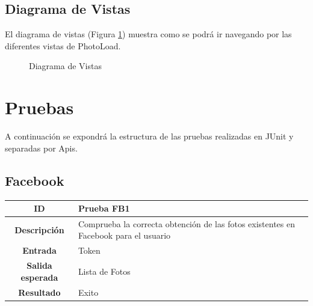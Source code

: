 \documentclass{scrartcl}
\begin{document}
\subsection{Diagrama de Vistas}\label{cap:DiagramaVistas}
El diagrama de vistas (Figura \ref{fig:DiagramaVistas}) muestra como se podrá ir navegando por las diferentes vistas de PhotoLoad.
\begin{figure}[H]
	
	\centering
	\caption{Diagrama de Vistas}
	\label{fig:DiagramaVistas}
	
\end{figure}
\section{Pruebas}\label{cap:pruebas}
A continuación se expondrá la estructura de las pruebas realizadas en JUnit y separadas por Apis.
\subsection{Facebook}

\begin{tabularx}{14cm}{|c|X|}
	\hline \textbf{ID} & Prueba FB1\\ 
	\hline \textbf{Descripción} & Comprueba la correcta obtención de las fotos existentes en Facebook para el usuario \\	 
	\hline  \textbf{Entrada}		& Token \\ 
	\hline  \textbf{Salida esperada}			& Lista de Fotos\\
	\hline  \textbf{Resultado}			& Exito \\
	\hline 
	\end{tabularx} 
\\
\\
\end{document}
